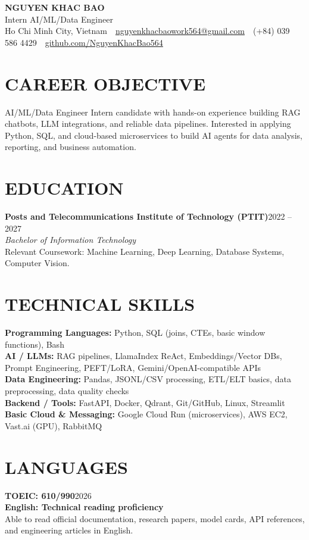 \documentclass[10pt,a4paper]{article}
\newcommand{\entryhead}[2]{%
    \noindent\textbf{#1}\hfill #2\\[-2pt]
}
\newcommand{\entrysub}[1]{%
    \noindent\textit{#1}\\[-1pt]
}
\begin{document}
\fontsize{9.25}{10.25}\selectfont

\begin{center}
    {\Large\textbf{NGUYEN KHAC BAO}}\\[-1pt]
    Intern AI/ML/Data Engineer\\[2pt]
    Ho Chi Minh City, Vietnam
    \,\textbar\,
    \href{mailto:nguyenkhacbaowork564@gmail.com}{nguyenkhacbaowork564@gmail.com}
    \,\textbar\,
    (+84) 039 586 4429
    \,\textbar\,
    \href{https://github.com/NguyenKhacBao564}{github.com/NguyenKhacBao564}
\end{center}

\section{CAREER OBJECTIVE}
AI/ML/Data Engineer Intern candidate with hands-on experience building RAG chatbots, LLM integrations, and reliable data pipelines. Interested in applying Python, SQL, and cloud-based microservices to build AI agents for data analysis, reporting, and business automation.

\section{EDUCATION}
\entryhead{Posts and Telecommunications Institute of Technology (PTIT)}{2022 -- 2027}
\entrysub{Bachelor of Information Technology}
Relevant Coursework: Machine Learning, Deep Learning, Database Systems, Computer Vision.

\section{TECHNICAL SKILLS}
\textbf{Programming Languages:} Python, SQL (joins, CTEs, basic window functions), Bash\\
\textbf{AI / LLMs:} RAG pipelines, LlamaIndex ReAct, Embeddings/Vector DBs, Prompt Engineering, PEFT/LoRA, Gemini/OpenAI-compatible APIs\\
\textbf{Data Engineering:} Pandas, JSONL/CSV processing, ETL/ELT basics, data preprocessing, data quality checks\\
\textbf{Backend / Tools:} FastAPI, Docker, Qdrant, Git/GitHub, Linux, Streamlit\\
\textbf{Basic Cloud \& Messaging:} Google Cloud Run (microservices), AWS EC2, Vast.ai (GPU), RabbitMQ

\section{LANGUAGES}
\entryhead{TOEIC: 610/990}{2026}
\entryhead{English: Technical reading proficiency}{}
Able to read official documentation, research papers, model cards, API references, and engineering articles in English.
\end{document}
